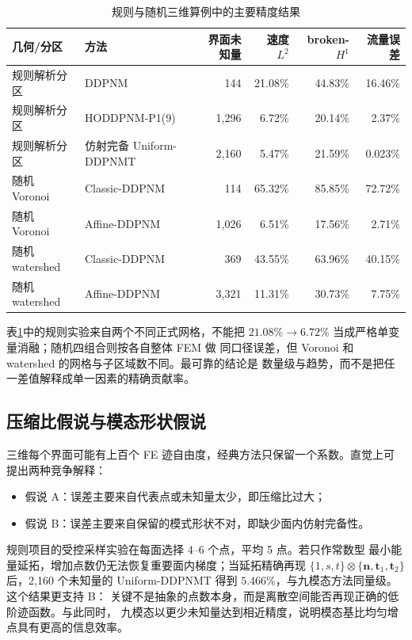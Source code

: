 \documentclass[UTF8,zihao=-4]{ctexart}
\begin{document}
\begin{table}[htbp]
\centering
\caption{规则与随机三维算例中的主要精度结果}
\label{tab:main-errors}
\small
\begin{tabular}{llrrrr}
\toprule
几何/分区 & 方法 & 界面未知量 & 速度 $L^2$ & broken-$H^1$ & 流量误差\\
\midrule
规则解析分区 & DDPNM & 144 & 21.08\% & 44.83\% & 16.46\%\\
规则解析分区 & HODDPNM-P1(9) & 1,296 & 6.72\% & 20.14\% & 2.37\%\\
规则解析分区 & 仿射完备 Uniform-DDPNMT & 2,160 & 5.47\% & 21.59\% & 0.023\%\\
随机 Voronoi & Classic-DDPNM & 114 & 65.32\% & 85.85\% & 72.72\%\\
随机 Voronoi & Affine-DDPNM & 1,026 & 6.51\% & 17.56\% & 2.71\%\\
随机 watershed & Classic-DDPNM & 369 & 43.55\% & 63.96\% & 40.15\%\\
随机 watershed & Affine-DDPNM & 3,321 & 11.31\% & 30.73\% & 7.75\%\\
\bottomrule
\end{tabular}
\end{table}

表\ref{tab:main-errors}中的规则实验来自两个不同正式网格，不能把
$21.08\%\to6.72\%$ 当成严格单变量消融；随机四组合则按各自整体 FEM 做
同口径误差，但 Voronoi 和 watershed 的网格与子区域数不同。最可靠的结论是
数量级与趋势，而不是把任一差值解释成单一因素的精确贡献率。

\subsection{压缩比假说与模态形状假说}

三维每个界面可能有上百个 FE 迹自由度，经典方法只保留一个系数。直觉上可
提出两种竞争解释：
\begin{itemize}
  \item 假说 A：误差主要来自代表点或未知量太少，即压缩比过大；
  \item 假说 B：误差主要来自保留的模式形状不对，即缺少面内仿射完备性。
\end{itemize}
规则项目的受控采样实验在每面选择 $4$--$6$ 个点，平均 5 点。若只作常数型
最小能量延拓，增加点数仍无法恢复重要面内梯度；当延拓精确再现
$\{1,s,t\}\otimes\{\bm n,\bm t_1,\bm t_2\}$ 后，2,160 个未知量的
Uniform-DDPNMT 得到 $5.466\%$，与九模态方法同量级。这个结果更支持 B：
关键不是抽象的点数本身，而是离散空间能否再现正确的低阶迹函数。与此同时，
九模态以更少未知量达到相近精度，说明模态基比均匀增点具有更高的信息效率。
\end{document}
